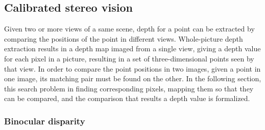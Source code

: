 

\subsection{Calibrated stereo vision} %

Given two or more views of a same scene, depth for a point can be extracted by comparing the positions of the point in different views.
Whole-picture depth extraction results in a depth map imaged from a single view, giving a depth value for each pixel in a picture, resulting in a set of three-dimensional points seen by that view.
In order to compare the point positions in two images, given a point in one image, its matching pair must be found on the other.
In the following section, this search problem in finding corresponding pixels, mapping them so that they can be compared, and the comparison that results a depth value is formalized.


\subsubsection{Binocular disparity} \label{sec:binocular} %


